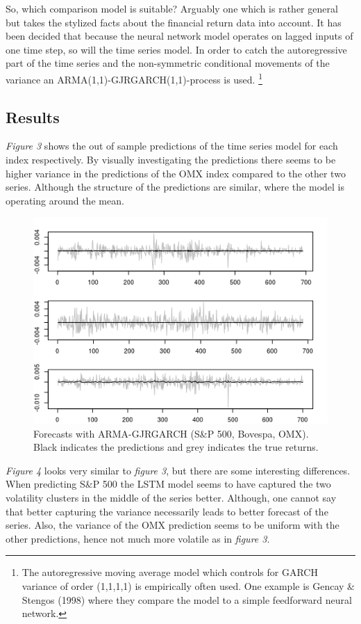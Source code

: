 \documentclass[12pt, letterpaper]{amsart}%
\begin{document}
So, which comparison model is suitable? Arguably one which is rather general but takes the stylized facts about the financial return data into account. It has been decided that because the neural network model operates on lagged inputs of one time step, so will the time series model. In order to catch the autoregressive part of the time series and the non-symmetric conditional movements of the variance an ARMA(1,1)-GJRGARCH(1,1)-process is used. \footnote{The autoregressive moving average model which controls for GARCH variance of order (1,1,1,1) is empirically often used. One example is Gencay \& Stengos (1998) where they compare the model to a simple feedforward neural network.}

\subsection{Results}
\textit{Figure 3} shows the out of sample predictions of the time series model for each index respectively. By visually investigating the predictions there seems to be higher variance in the predictions of the OMX index compared to the other two series. Although the structure of the predictions are similar, where the model is operating around the mean.
\\

\begin{figure}[h]%
\caption{Forecasts with ARMA-GJRGARCH (S\&P 500, Bovespa, OMX). Black indicates the predictions and grey indicates the true returns.}
\centering
\includegraphics[scale=1]{garch_pred2.png}
\end{figure}

\textit{Figure 4} looks very similar to \textit{figure 3}, but there are some interesting differences. When predicting S\&P 500 the LSTM model seems to have captured the two volatility clusters in the middle of the series better. Although, one cannot say that better capturing the variance necessarily leads to better forecast of the series. Also, the variance of the OMX prediction seems to be uniform with the other predictions, hence not much more volatile as in \textit{figure 3}.
\\
\end{document}
